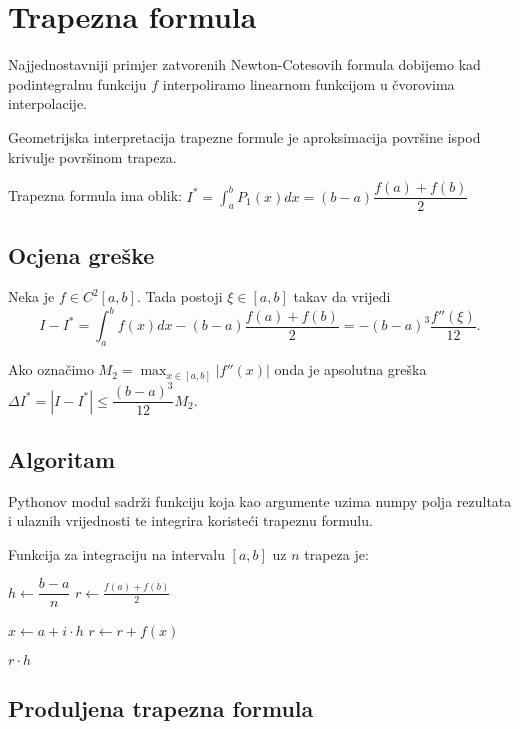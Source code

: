 \section{Trapezna formula}

Najjednostavniji primjer zatvorenih Newton-Cotesovih formula dobijemo kad
podintegralnu funkciju $f$ interpoliramo linearnom funkcijom u čvorovima
interpolacije.

Geometrijska interpretacija trapezne formule je aproksimacija površine ispod
krivulje površinom trapeza.

Trapezna formula ima oblik: $\displaystyle
I^* = \int_a^b P_1(x)dx = (b-a)\dfrac{f(a)+f(b)}{2}
$

\subsection{Ocjena greške}

Neka je $f\in C^2[a,b]$. Tada postoji $\xi \in [a,b]$ takav da vrijedi
$$
I - I^* = \int_a^b f(x) dx - (b-a)\dfrac{f(a)+f(b)}{2} = -(b-a)^3\dfrac{f''(\xi)}{12}.
$$

Ako označimo $\displaystyle M_2 = \max_{x\in[a,b]}|f''(x)|$ onda je apsolutna
greška $\displaystyle \Delta I^* = |I - I^*| \leq \dfrac{(b-a)^3}{12}M_2.$

\subsection{Algoritam}

Pythonov  modul sadrži  funkciju koja kao
argumente uzima numpy polja rezultata i ulaznih vrijednosti te integrira
koristeći trapeznu formulu.

Funkcija za integraciju na intervalu $[a, b]$ uz $n$ trapeza je:
\begin{algorithmic}
    \State $h \gets \dfrac{b - a}{n}$
    \State $r \gets \frac{f(a) + f(b)}{2}$
    
      \State $x \gets a + i \cdot h$
      \State $r \gets r + f(x)$
    \EndFor
    
    \State \Return $r \cdot h$
\EndFunction
\end{algorithmic}

\subsection{Produljena trapezna formula}

